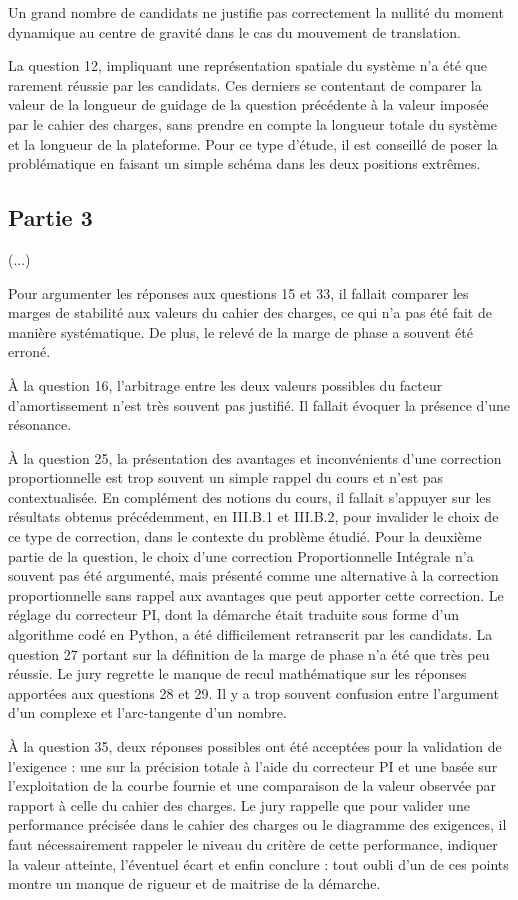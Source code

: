 \documentclass[10pt,fleqn]{article} %
\begin{document}
Un grand nombre de candidats ne justifie pas correctement la nullité du moment dynamique au centre
de gravité dans le cas du mouvement de translation.

La question 12, impliquant une représentation spatiale du système n’a été que rarement réussie par les
candidats. Ces derniers se contentant de comparer la valeur de la longueur de guidage de la question
précédente à la valeur imposée par le cahier des charges, sans prendre en compte la longueur totale du
système et la longueur de la plateforme. Pour ce type d’étude, il est conseillé de poser la problématique
en faisant un simple schéma dans les deux positions extrêmes.

\subsection*{Partie 3}
(...)

Pour argumenter les réponses aux questions 15 et 33, il fallait comparer les marges de stabilité aux valeurs
du cahier des charges, ce qui n’a pas été fait de manière systématique. De plus, le relevé de la marge de
phase a souvent été erroné.

À la question 16, l’arbitrage entre les deux valeurs possibles du facteur d’amortissement n’est très souvent
pas justifié. Il fallait évoquer la présence d’une résonance.

À la question 25, la présentation des avantages et inconvénients d’une correction proportionnelle est trop
souvent un simple rappel du cours et n’est pas contextualisée. En complément des notions du cours, il
fallait s’appuyer sur les résultats obtenus précédemment, en III.B.1 et III.B.2, pour invalider le choix de
ce type de correction, dans le contexte du problème étudié. Pour la deuxième partie de la question, le
choix d’une correction Proportionnelle Intégrale n’a souvent pas été argumenté, mais présenté comme une
alternative à la correction proportionnelle sans rappel aux avantages que peut apporter cette correction.
Le réglage du correcteur PI, dont la démarche était traduite sous forme d’un algorithme codé en Python, a
été difficilement retranscrit par les candidats. La question 27 portant sur la définition de la marge de phase
n’a été que très peu réussie. Le jury regrette le manque de recul mathématique sur les réponses apportées
aux questions 28 et 29. Il y a trop souvent confusion entre l’argument d’un complexe et l’arc-tangente
d’un nombre.

À la question 35, deux réponses possibles ont été acceptées pour la validation de l’exigence : une sur la
précision totale à l’aide du correcteur PI et une basée sur l’exploitation de la courbe fournie et une comparaison de la valeur observée par rapport à celle du cahier des charges. Le jury rappelle que pour valider
une performance précisée dans le cahier des charges ou le diagramme des exigences, il faut nécessairement
rappeler le niveau du critère de cette performance, indiquer la valeur atteinte, l’éventuel écart et enfin
conclure : tout oubli d’un de ces points montre un manque de rigueur et de maitrise de la démarche.
\end{document}

